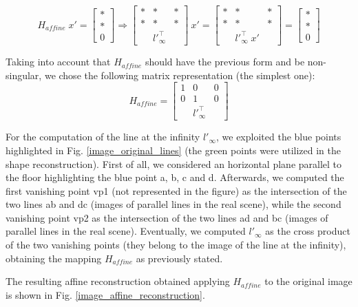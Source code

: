 \documentclass[11pt, oneside]{article}
\begin{document}
\begin{equation}
	H_{affine} \; x' = 
	\begin{bmatrix}
		* \\ * \\ 0
	\end{bmatrix}
	\Rightarrow
	\begin{bmatrix}
		* & * & * \\ * & * & * \\ & {l'}^{\intercal}_{\infty} &
	\end{bmatrix}
	\: x' =
	\begin{bmatrix}
		* & * & * \\ * & * & * \\ & {l'}^{\intercal}_{\infty} \; x' &
	\end{bmatrix}
	=
	\begin{bmatrix}
		* \\ * \\ 0
	\end{bmatrix}
\end{equation}

Taking into account that $H_{affine}$ should have the previous form and be non-singular, we chose the following matrix representation (the simplest one):
\begin{equation}
	H_{affine} =
	\begin{bmatrix}
		1 & 0 & 0 \\ 0 & 1 & 0 \\ & {l'}^{\intercal}_{\infty} &
	\end{bmatrix}
\end{equation}

For the computation of the line at the infinity $l'_{\infty}$, we exploited the blue points highlighted in Fig. \ref{image_original_lines} (the green points were utilized in the shape reconstruction). First of all, we considered an horizontal plane parallel to the floor highlighting the blue point a, b, c and d. Afterwards, we computed the first vanishing point vp1 (not represented in the figure) as the intersection of the two lines ab and dc (images of parallel lines in the real scene), while the second vanishing point vp2 as the intersection of the two lines ad and bc (images of parallel lines in the real scene). Eventually, we computed $l'_{\infty}$ as the cross product of the two vanishing points (they belong to the image of the line at the infinity), obtaining the mapping $H_{affine}$ as previously stated.

The resulting affine reconstruction obtained applying $H_{affine}$ to the original image is shown in Fig. \ref{image_affine_reconstruction}.
\end{document}
